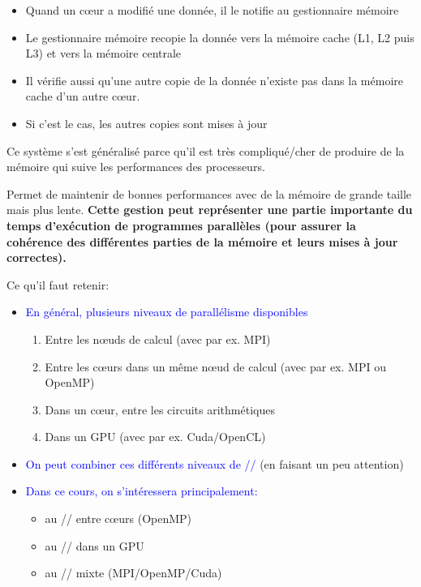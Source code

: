\documentclass{beamer}
\begin{document}
\begin{frame}

\vfill
\begin{itemize}
\item Quand un c\oe ur a modifi\'e une donn\'ee, il le notifie au gestionnaire m\'emoire
\vfill
\item Le gestionnaire m\'emoire recopie la donn\'ee vers la m\'emoire cache (L1, L2 puis L3) et vers la m\'emoire centrale
\vfill
\item Il v\'erifie aussi qu'une autre copie de la donn\'ee n'existe pas dans la m\'emoire cache d'un autre c\oe ur.
\vfill
\item Si c'est le cas, les autres copies sont mises \`a jour
\end{itemize}
	\vfill
\end{frame}

\begin{frame}[fragile]
	
	\vfill
Ce système s'est généralisé parce qu'il est très compliqué/cher de produire de la mémoire qui suive les performances des processeurs. 

Permet de maintenir de bonnes performances avec de la mémoire de grande taille mais plus lente.
	\vfill
{\bf Cette gestion peut repr\'esenter une partie im\-por\-tante du temps d'ex\'ecution de programmes parallèles (pour assurer la coh\'erence des diff\'erentes parties de la m\'emoire et leurs mises \`a jour correctes).}
	\vfill	
	
\end{frame}
\begin{frame}
	Ce qu'il faut retenir:

	\bigskip
	\begin{itemize}
		\item \textcolor{blue}{En général, plusieurs niveaux de parallélisme disponibles}
		\begin{enumerate}
			\item Entre les nœuds de calcul (avec par ex. MPI)
			\item Entre les cœurs dans un même nœud de calcul (avec par ex. MPI ou OpenMP)
			\item Dans un cœur, entre les circuits arithmétiques 
			\item Dans un GPU (avec par ex. Cuda/OpenCL)
		\end{enumerate}
		\medskip
		
		\item  \textcolor{blue}{On peut combiner ces différents niveaux de //} (en faisant un peu attention) 
		\medskip
		
		\item  \textcolor{blue}{Dans ce cours, on s'intéressera principalement:}
		\begin{itemize}
			\item au // entre cœurs (OpenMP)
			\item au // dans un GPU
			\item au // mixte (MPI/OpenMP/Cuda)
		\end{itemize}
	\end{itemize}
\end{frame}
\end{document}
